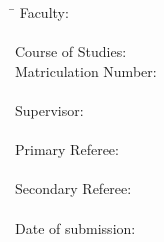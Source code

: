 \begin{titlepage}
\begin{tabbing}
	\hspace{10em} \=  \kill
	Faculty: \>  \faculty \\
	\> \fachbereich \\
	Course of Studies: \>  \courseOfStudies \\ %
	Matriculation Number: \>  \myMatNr \\ \\
	Supervisor: \> \supervisor \\
	 \>	\supervisorInst \\					   %
	Primary Referee: \> \primaryReferee \\
	 \>	\primaryRefereeInst \\
	Secondary Referee: \> \secondaryReferee \\
	 \>	\secondaryRefereeInst \\
	Date of submission: \> \dateOfSubmission \\
\end{tabbing}

\newpage

\thispagestyle{empty}
\setcounter{page}{0}

~\\ \vfill \noindent
\optionalQuote

\end{titlepage}

